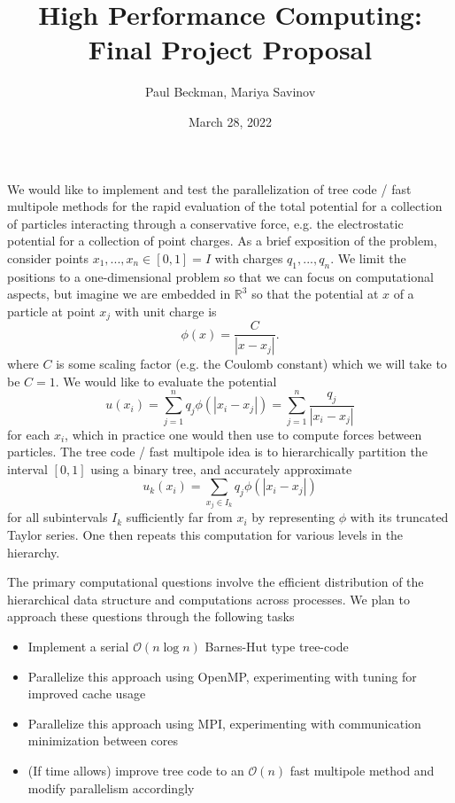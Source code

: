\documentclass{article}
\title{High Performance Computing: Final Project Proposal}
\author{Paul Beckman, Mariya Savinov}
\date{March 28, 2022}
\newcommand{\abs}[1]{\left|#1\right|}
\renewcommand{\O}{\mathcal{O}}
\newcommand{\R}{\mathbb{R}}
\begin{document}
\maketitle

We would like to implement and test the parallelization of tree code \cite{barnes1986hierarchical} / fast multipole methods \cite{greengard1987fast} for the rapid evaluation of the total potential for a collection of particles interacting through a conservative force, e.g. the electrostatic potential for a collection of point charges. As a brief exposition of the problem, consider points $x_1, ..., x_n \in [0,1] = I$ with charges $q_1, ..., q_n$. We limit the positions to a one-dimensional problem so that we can focus on computational aspects, but imagine we are embedded in $\R^3$ so that the potential at $x$ of a particle at point $x_j$ with unit charge is
\begin{equation}
  \phi(x) = \frac{C}{\abs{x-x_j}}.
\end{equation}
where $C$ is some scaling factor (e.g. the Coulomb constant) which we will take to be $C=1$. We would like to evaluate the potential
\begin{equation}
  u(x_i) = \sum_{j=1}^n q_j \phi(\abs{x_i - x_j}) = \sum_{j=1}^n \dfrac{q_j}{\abs{x_i-x_j}}
\end{equation}
for each $x_i$, which in practice one would then use to compute forces between particles. The tree code / fast multipole idea is to hierarchically partition the interval $[0,1]$ using a binary tree, and accurately approximate
\begin{equation}
  u_k(x_i) = \sum_{x_j \in I_k} q_j \phi(\abs{x_i - x_j})
\end{equation} for all subintervals $I_k$ sufficiently far from $x_i$ by representing $\phi$ with its truncated Taylor series. One then repeats this computation for various levels in the hierarchy.

The primary computational questions involve the efficient distribution of the hierarchical data structure and computations across processes. We plan to approach these questions through the following tasks
\begin{itemize}
  \item Implement a serial $\O(n\log n)$ Barnes-Hut type tree-code
  \item Parallelize this approach using OpenMP, experimenting with tuning for improved cache usage
  \item Parallelize this approach using MPI, experimenting with communication minimization between cores
  \item (If time allows) improve tree code to an $\O(n)$ fast multipole method and modify parallelism accordingly
\end{itemize}



\end{document}

